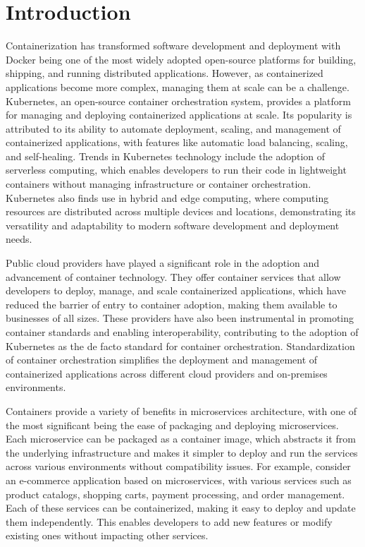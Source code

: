 \section{Introduction}
Containerization has transformed software development and deployment with Docker being one of the most widely adopted open-source platforms for building, shipping, and running distributed applications. However, as containerized applications become more complex, managing them at scale can be a challenge. Kubernetes, an open-source container orchestration system, provides a platform for managing and deploying containerized applications at scale. Its popularity is attributed to its ability to automate deployment, scaling, and management of containerized applications, with features like automatic load balancing, scaling, and self-healing. Trends in Kubernetes technology include the adoption of serverless computing, which enables developers to run their code in lightweight containers without managing infrastructure or container orchestration. Kubernetes also finds use in hybrid and edge computing, where computing resources are distributed across multiple devices and locations, demonstrating its versatility and adaptability to modern software development and deployment needs.


Public cloud providers have played a significant role in the adoption and advancement of container technology. They offer container services that allow developers to deploy, manage, and scale containerized applications, which have reduced the barrier of entry to container adoption, making them available to businesses of all sizes. These providers have also been instrumental in promoting container standards and enabling interoperability, contributing to the adoption of Kubernetes as the de facto standard for container orchestration. Standardization of container orchestration simplifies the deployment and management of containerized applications across different cloud providers and on-premises environments.


Containers provide a variety of benefits in microservices architecture, with one of the most significant being the ease of packaging and deploying microservices. Each microservice can be packaged as a container image, which abstracts it from the underlying infrastructure and makes it simpler to deploy and run the services across various environments without compatibility issues. For example, consider an e-commerce application based on microservices, with various services such as product catalogs, shopping carts, payment processing, and order management. Each of these services can be containerized, making it easy to deploy and update them independently. This enables developers to add new features or modify existing ones without impacting other services.


